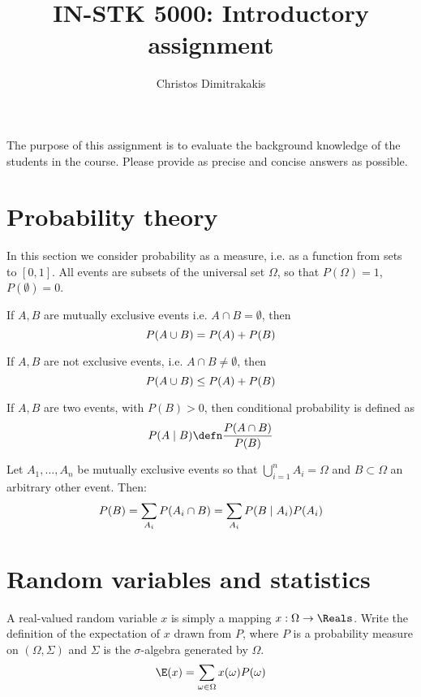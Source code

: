 \documentclass[a4paper]{article}
\title{IN-STK 5000: Introductory assignment}
\author{Christos Dimitrakakis}
\def\solution {0}
\begin{document}
\maketitle
The purpose of this assignment is to evaluate the background knowledge
of the students in the course. Please provide as precise and concise
answers as possible. 

\section{Probability theory}
In this section we consider probability as a measure, i.e. as a function from sets to $[0,1]$. All events are subsets of the universal set $\Omega$, so that $P(\Omega) = 1$, $P(\emptyset) = 0$.
\begin{exercise}
  If $A, B$ are mutually exclusive events i.e. $A \cap B = \emptyset$,  then 
  \[
  P(A \cup B) =
  \ifdefined \solution
  P(A) + P(B)
  \else
  \ldots
  \fi
  \]
\end{exercise}
\begin{exercise}
  If $A, B$ are not exclusive events, i.e. $A \cap B \neq \emptyset$, then 
  \[
  P(A \cup B) \leq
  \ifdefined \solution
  P(A) + P(B)
  \else
  \ldots
  \fi
  \]
\end{exercise}

\begin{exercise}
  If $A, B$ are two events, with $P(B) > 0$, then conditional probability is defined as
  \[
  P(A \mid B) \defn 
  \ifdefined \solution
  \frac{P(A \cap B)}{P(B)}
  \else
  \ldots
  \fi
  \]
\end{exercise}

\begin{exercise}
  Let $A_1, \ldots, A_n$ be mutually exclusive events so that $\bigcup_{i=1}^n A_i = \Omega$ and $B \subset \Omega$ an arbitrary other event. Then:
  \[
  P(B) = \sum_{A_i} 
  \ifdefined \solution
  P(A_i \cap B)
  =
  \sum_{A_i} 
  P(B \mid A_i)
  P(A_i )
  \else
  \ldots
  \fi
  \]
\end{exercise}

\section{Random variables and statistics}


\begin{exercise}
  A real-valued random variable $x$ is simply a mapping $x : \Omega \to \Reals$.
  Write the definition of the expectation of $x$ drawn from $P$, where $P$ is a probability measure on $(\Omega, \Sigma)$ and $\Sigma$ is the $\sigma$-algebra generated by $\Omega$.
  \[
  \E(x) = 
  \ifdefined \solution
  \sum_{\omega \in \Omega} x(\omega) P(\omega) 
  \else
  \ldots
  \fi
  \]
\end{exercise}
\end{document}
